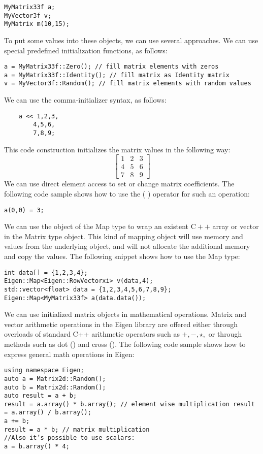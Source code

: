 \documentclass[12pt]{article}
\begin{document}
\begin{verbatim}
MyMatrix33f a; 
MyVector3f v;
MyMatrix m(10,15);
\end{verbatim}


To put some values into these objects, we can use several approaches. We can use special predefined initialization functions, as follows:
\begin{verbatim}
a = MyMatrix33f::Zero(); // fill matrix elements with zeros
a = MyMatrix33f::Identity(); // fill matrix as Identity matrix
v = MyVector3f::Random(); // fill matrix elements with random values   
\end{verbatim}
We can use the comma-initializer syntax, as follows:
\begin{verbatim}
    a << 1,2,3,
        4,5,6,
        7,8,9;
\end{verbatim}
This code construction initializes the matrix values in the following way:
$$
\left[\begin{array}{lll}
1 & 2 & 3 \\
4 & 5 & 6 \\
7 & 8 & 9
\end{array}\right]
$$
We can use direct element access to set or change matrix coefficients. The following code sample shows how to use the ( ) operator for such an operation:
\begin{verbatim}
a(0,0) = 3;    
\end{verbatim}

We can use the object of the Map type to wrap an existent $\mathrm{C}++$ array or vector in the Matrix type object. This kind of mapping object will use memory and values from the underlying object, and will not allocate the additional memory and copy the values. The following snippet shows how to use the Map type:

\begin{verbatim}
int data[] = {1,2,3,4}; 
Eigen::Map<Eigen::RowVectorxi> v(data,4); 
std::vector<float> data = {1,2,3,4,5,6,7,8,9}; 
Eigen::Map<MyMatrix33f> a(data.data());    
\end{verbatim}

We can use initialized matrix objects in mathematical operations. Matrix and vector arithmetic operations in the Eigen library are offered either through overloads of standard C++ arithmetic operators such as $+,-, \star,$ or through methods such as dot () and cross (). The following code sample shows how to express general math operations in Eigen:

\begin{verbatim}
using namespace Eigen;
auto a = Matrix2d::Random();
auto b = Matrix2d::Random();
auto result = a + b;
result = a.array() * b.array(); // element wise multiplication result = a.array() / b.array();
a += b;
result = a * b; // matrix multiplication
//Also it’s possible to use scalars:
a = b.array() * 4;    
\end{verbatim}
\end{document}
